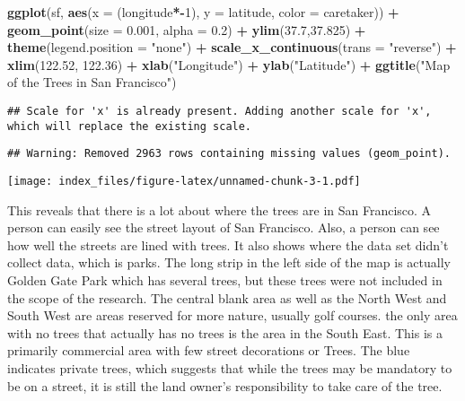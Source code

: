 \documentclass[
]{article}
\newenvironment{Shaded}{\begin{snugshade}}{\end{snugshade}}
\newcommand{\DataTypeTok}[1]{\textcolor[rgb]{0.13,0.29,0.53}{#1}}
\newcommand{\DecValTok}[1]{\textcolor[rgb]{0.00,0.00,0.81}{#1}}
\newcommand{\FloatTok}[1]{\textcolor[rgb]{0.00,0.00,0.81}{#1}}
\newcommand{\KeywordTok}[1]{\textcolor[rgb]{0.13,0.29,0.53}{\textbf{#1}}}
\newcommand{\NormalTok}[1]{#1}
\newcommand{\OperatorTok}[1]{\textcolor[rgb]{0.81,0.36,0.00}{\textbf{#1}}}
\newcommand{\StringTok}[1]{\textcolor[rgb]{0.31,0.60,0.02}{#1}}
\begin{document}
\begin{Shaded}
\begin{Highlighting}[]
\KeywordTok{ggplot}\NormalTok{(sf, }\KeywordTok{aes}\NormalTok{(}\DataTypeTok{x =}\NormalTok{ (longitude}\OperatorTok{*-}\DecValTok{1}\NormalTok{), }\DataTypeTok{y =}\NormalTok{ latitude, }\DataTypeTok{color =}\NormalTok{ caretaker)) }\OperatorTok{+}
\StringTok{  }\KeywordTok{geom_point}\NormalTok{(}\DataTypeTok{size =} \FloatTok{0.001}\NormalTok{, }\DataTypeTok{alpha =} \FloatTok{0.2}\NormalTok{) }\OperatorTok{+}
\StringTok{  }\KeywordTok{ylim}\NormalTok{(}\FloatTok{37.7}\NormalTok{,}\FloatTok{37.825}\NormalTok{) }\OperatorTok{+}
\StringTok{  }\KeywordTok{theme}\NormalTok{(}\DataTypeTok{legend.position =} \StringTok{"none"}\NormalTok{) }\OperatorTok{+}
\StringTok{  }\KeywordTok{scale_x_continuous}\NormalTok{(}\DataTypeTok{trans =} \StringTok{"reverse"}\NormalTok{) }\OperatorTok{+}
\StringTok{  }\KeywordTok{xlim}\NormalTok{(}\FloatTok{122.52}\NormalTok{, }\FloatTok{122.36}\NormalTok{) }\OperatorTok{+}\StringTok{   }
\StringTok{  }\KeywordTok{xlab}\NormalTok{(}\StringTok{"Longitude"}\NormalTok{) }\OperatorTok{+}
\StringTok{  }\KeywordTok{ylab}\NormalTok{(}\StringTok{"Latitude"}\NormalTok{) }\OperatorTok{+}
\StringTok{  }\KeywordTok{ggtitle}\NormalTok{(}\StringTok{"Map of the Trees in San Francisco"}\NormalTok{)}
\end{Highlighting}
\end{Shaded}

\begin{verbatim}
## Scale for 'x' is already present. Adding another scale for 'x', which will replace the existing scale.
\end{verbatim}

\begin{verbatim}
## Warning: Removed 2963 rows containing missing values (geom_point).
\end{verbatim}

\texttt{[image: index\_files/figure-latex/unnamed-chunk-3-1.pdf]}

This reveals that there is a lot about where the trees are in San
Francisco. A person can easily see the street layout of San Francisco.
Also, a person can see how well the streets are lined with trees. It
also shows where the data set didn't collect data, which is parks. The
long strip in the left side of the map is actually Golden Gate Park
which has several trees, but these trees were not included in the scope
of the research. The central blank area as well as the North West and
South West are areas reserved for more nature, usually golf courses. the
only area with no trees that actually has no trees is the area in the
South East. This is a primarily commercial area with few street
decorations or Trees. The blue indicates private trees, which suggests
that while the trees may be mandatory to be on a street, it is still the
land owner's responsibility to take care of the tree.
\end{document}
